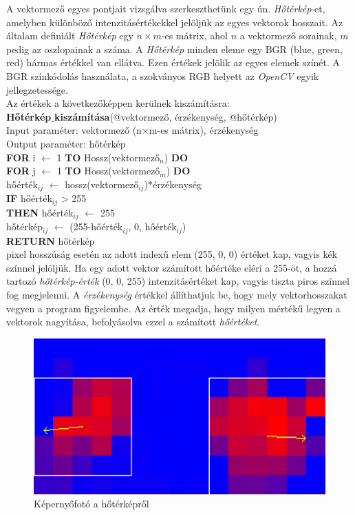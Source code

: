 
A vektormező egyes pontjait vizsgálva szerkeszthetünk egy ún. \textit{Hőtérkép}-et, amelyben különböző intenzitásértékekkel jelöljük az egyes vektorok hosszait. Az általam definiált \textit{Hőtérkép} egy $n \times m$-es mátrix, ahol $n$ a vektormező sorainak, $m$ pedig az oszlopainak a száma. A \textit{Hőtérkép} minden eleme egy BGR (blue, green, red) hármas értékkel van ellátva. Ezen értékek jelölik az egyes elemek színét. A BGR színkódolás használata, a szokványos RGB helyett az \textit{OpenCV} egyik jellegzetessége.\\
Az értékek a következőképpen kerülnek kiszámításra:\\
\newline
\noindent \textbf{Hőtérkép$\_$kiszámítása}(@vektormező, érzékenység, @hőtérkép)\\ 
Input paraméter: vektormező (n$\times$m-es mátrix), érzékenység\\
Output paraméter: hőtérkép\\
\textbf{FOR} i $\leftarrow$ 1 \textbf{TO} Hossz(vektormező$_n$) \textbf{DO}\\
\indent \textbf{FOR} j $\leftarrow$ 1 \textbf{TO} Hossz(vektormező$_m$) \textbf{DO}\\
\indent \indent hőérték$_{ij}$ $\leftarrow$ hossz(vektormező$_{ij}$)*érzékenység\\
\indent \indent \textbf{IF} hőérték$_{ij}$ > 255\\
\indent \indent \indent \textbf{THEN} hőérték$_{ij}$ $\leftarrow$ 255\\
\indent \indent hőtérkép$_{ij}$ $\leftarrow$ (255-hőérték$_{ij}$, 0, hőérték$_{ij}$)\\
\textbf{RETURN} hőtérkép\\
 pixel hosszúság esetén az adott indexű elem (255, 0, 0) értéket kap, vagyis kék színnel jelöljük. Ha egy adott vektor számított hőértéke eléri a 255-öt, a hozzá tartozó \textit{hőtérkép-érték} (0, 0, 255) intenzitásértéket kap, vagyis tiszta piros színnel fog megjelenni.
A \textit{érzékenység} értékkel állíthatjuk be, hogy mely vektorhosszakat vegyen a program figyelembe. Az érték megadja, hogy milyen mértékű legyen a vektorok nagyítása, befolyásolva ezzel a számított \textit{hőértéket}.
\begin{figure}[h]
\centering
\includegraphics[width=11.2truecm, height=6.3truecm]{images/HeatMap_screenshot.png}
\caption{Képernyőfotó a hőtérképről}
\label{fig:heatmap}
\end{figure}
